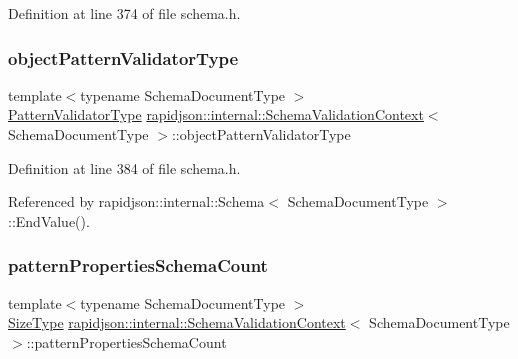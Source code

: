 Definition at line 374 of file schema.\+h.

\mbox{\label{structrapidjson_1_1internal_1_1_schema_validation_context_a39123245bbc6137fa49827014f9e7f3e}} 
\subsubsection{\texorpdfstring{objectPatternValidatorType}{objectPatternValidatorType}}
{\footnotesize\ttfamily template$<$typename Schema\+Document\+Type $>$ \\
\mbox{\hyperlink{structrapidjson_1_1internal_1_1_schema_validation_context_ad47d3576f164e17986132a570f721a46}{Pattern\+Validator\+Type}} \mbox{\hyperlink{structrapidjson_1_1internal_1_1_schema_validation_context}{rapidjson\+::internal\+::\+Schema\+Validation\+Context}}$<$ Schema\+Document\+Type $>$\+::object\+Pattern\+Validator\+Type}



Definition at line 384 of file schema.\+h.



Referenced by rapidjson\+::internal\+::\+Schema$<$ Schema\+Document\+Type $>$\+::\+End\+Value().

\mbox{\label{structrapidjson_1_1internal_1_1_schema_validation_context_ae1f553f9034c58f30bce6d7129941d3f}} 
\subsubsection{\texorpdfstring{patternPropertiesSchemaCount}{patternPropertiesSchemaCount}}
{\footnotesize\ttfamily template$<$typename Schema\+Document\+Type $>$ \\
\mbox{\hyperlink{namespacerapidjson_a44eb33eaa523e36d466b1ced64b85c84}{Size\+Type}} \mbox{\hyperlink{structrapidjson_1_1internal_1_1_schema_validation_context}{rapidjson\+::internal\+::\+Schema\+Validation\+Context}}$<$ Schema\+Document\+Type $>$\+::pattern\+Properties\+Schema\+Count}



